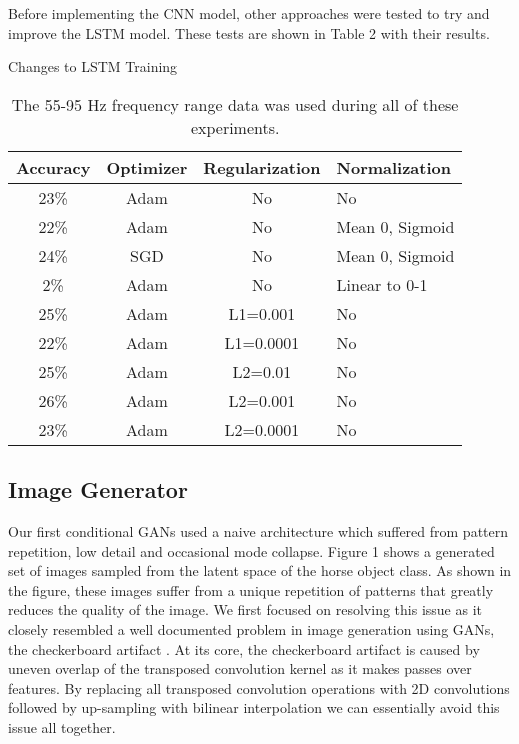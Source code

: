 \documentclass[sigplan,screen]{acmart}
\begin{document}
Before implementing the CNN model, other approaches were tested to try and improve the LSTM model. These tests are shown in Table 2 with their results.
\begin{table}
  \label{tab:freq}
  \caption{Changes to LSTM Training}
  \caption*{\footnotesize The 55-95 Hz frequency range data was used during all of these experiments.}
  \begin{tabular}{cccl}
    \toprule
    Accuracy & Optimizer & Regularization & Normalization\\
    \midrule
    23\% & Adam & No & No\\
    22\% & Adam & No & Mean 0, Sigmoid\\
    24\% & SGD & No & Mean 0, Sigmoid\\
    2\% & Adam & No & Linear to 0-1\\
    25\% & Adam & L1=0.001 & No\\
    22\% & Adam & L1=0.0001 & No\\
    25\% & Adam & L2=0.01 & No\\
    26\% & Adam & L2=0.001 & No\\
    23\% & Adam & L2=0.0001 & No\\
  \bottomrule
\end{tabular}
\end{table}


\subsection{Image Generator}
Our first conditional GANs used a naive architecture which suffered from pattern repetition, low detail and occasional mode collapse. Figure 1 shows a generated set of images sampled from the latent space of the horse object class. As shown in the figure, these images suffer from a unique repetition of patterns that greatly reduces the quality of the image. We first focused on resolving this issue as it closely resembled a well documented problem in image generation using GANs, the checkerboard artifact \cite{odena2016deconvolution}. At its core, the checkerboard artifact is caused by uneven overlap of the transposed convolution kernel as it makes passes over features. By replacing all transposed convolution operations with 2D convolutions followed by up-sampling with bilinear interpolation we can essentially avoid this issue all together. 
\end{document}
